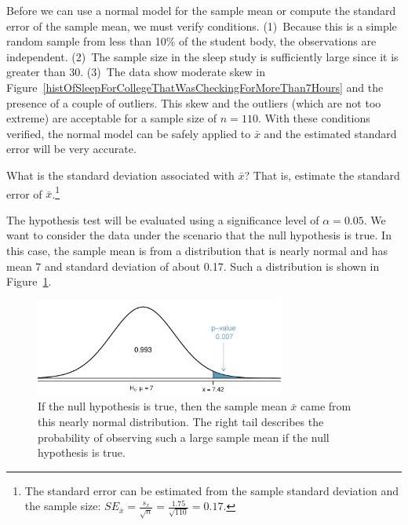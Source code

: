 Before we can use a normal model for the sample mean or compute the standard error of the sample mean, we must verify conditions. (1)~Because this is a simple random sample from less than 10\% of the student body, the observations are independent. (2)~The sample size in the sleep study is sufficiently large since it is greater than 30. (3)~The data show moderate skew in Figure~\ref{histOfSleepForCollegeThatWasCheckingForMoreThan7Hours} and the presence of a couple of outliers. This skew and the outliers (which are not too extreme) are acceptable for a sample size of $n=110$. With these conditions verified, the normal model can be safely applied to $\bar{x}$ and the estimated standard error will be very accurate.

\begin{exercise} \label{findSEOfFirstSleepStudyCheckingGreaterThan7Hours}
What is the standard deviation associated with $\bar{x}$? That is, estimate the standard error of $\bar{x}$.\footnote{The standard error can be estimated from the sample standard deviation and the sample size: $SE_{\bar{x}} = \frac{s_x}{\sqrt{n}} = \frac{1.75}{\sqrt{110}} = 0.17$.}
\end{exercise}

The hypothesis test will be evaluated using a significance level of $\alpha = 0.05$. We want to consider the data under the scenario that the null hypothesis is true. In this case, the sample mean is from a distribution that is nearly normal and has mean 7 and standard deviation of about 0.17. Such a distribution is shown in Figure~\ref{pValueOneSidedSleepStudy}.

\begin{figure}[hht]
   \centering
   \includegraphics[width=0.73\textwidth]{04/figures/pValueOneSidedSleepStudy/pValueOneSidedSleepStudy}
   \caption{If the null hypothesis is true, then the sample mean $\bar{x}$ came from this nearly normal distribution. The right tail describes the probability of observing such a large sample mean if the null hypothesis is true.}
   \label{pValueOneSidedSleepStudy}
\end{figure}

